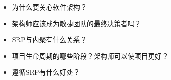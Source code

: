 \begin{itemize}
\item 
为什么要关心软件架构？

\item 
架构师应该成为敏捷团队的最终决策者吗？

\item 
SRP与内聚有什么关系？

\item 
项目生命周期的哪些阶段？架构师可以使项目更好？

\item 
遵循SRP有什么好处？
\end{itemize}